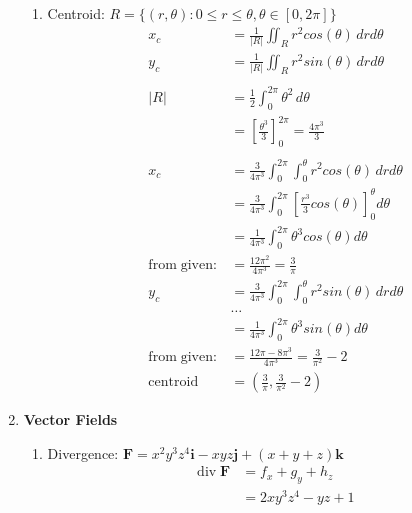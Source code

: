 \documentclass[11pt]{article}
\begin{document}
\begin{preview}
\begin{enumerate}
\begin{enumerate}
            \item Centroid: $R = \{ (r, \theta) : 0 \le r \le \theta, \theta \in [0, 2\pi] \}$
            \begin{align*}
                  x_c &= \frac{1}{|R|} \iint_R r^2cos(\theta) \,dr d\theta\\
                  y_c &= \frac{1}{|R|} \iint_R r^2sin(\theta) \,dr d\theta\\\\
                  |R| &= \frac{1}{2}\int_{0}^{2\pi} \theta^{2} \,d\theta \\
                  &= \left[ \frac{\theta^3}{3} \right]_{0}^{2\pi} = \frac{4\pi^3}{3} \\\\
                  x_c &= \frac{3}{4\pi^3} \int_{0}^{2\pi} \int_{0}^{\theta} r^{2}cos(\theta) \,dr d\theta \\
                  &= \frac{3}{4\pi^3} \int_{0}^{2\pi} \left[ \frac{r^{3}}{3}cos(\theta) \right]_{0}^{\theta} d\theta \\
                  &= \frac{1}{4\pi^3} \int_{0}^{2\pi} \theta^{3}cos(\theta) d\theta \\
                  \mathrm{from \; given:} &= \frac{12\pi^2}{4\pi^3} = \frac{3}{\pi} \\
                  y_c &= \frac{3}{4\pi^3} \int_{0}^{2\pi} \int_{0}^{\theta} r^{2}sin(\theta) \,dr d\theta \\ &\dots \\
                  &=\frac{1}{4\pi^3} \int_{0}^{2\pi} \theta^{3}sin(\theta) d\theta \\
                  \mathrm{from \; given:} &= \frac{12\pi-8\pi^3}{4\pi^3} = \frac{3}{\pi^2} - 2\\
                  \mathrm{centroid} &= \left(\frac{3}{\pi},\frac{3}{\pi^{2}}-2\right)
            \end{align*}
          \end{enumerate}
    \item \textbf{Vector Fields}
          \begin{enumerate}
            \item Divergence: $\textbf{F}=x^{2}y^{3}z^{4}\textbf{i} - xyz\textbf{j} + (x+y+z)\textbf{k}$
                  \begin{align*}
                    \mathrm{div} \; \textbf{F} & = f_{x} + g_{y} + h_{z} \\
                                               & = 2xy^{3}z^{4} -yz + 1  \\
                  \end{align*}

\end{enumerate}
\end{enumerate}
\end{preview}
\end{document}
